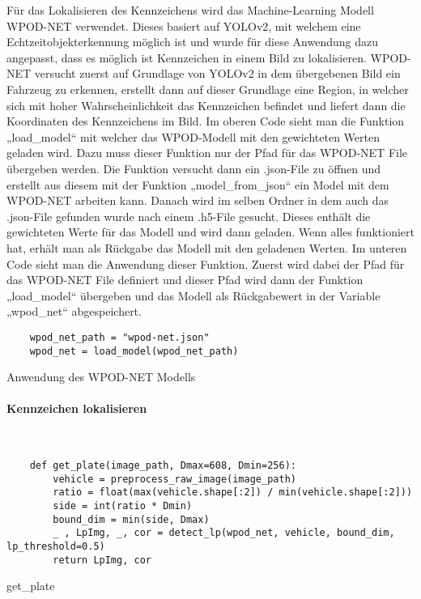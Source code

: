 Für das Lokalisieren des Kennzeichens wird das Machine-Learning Modell WPOD-NET verwendet. Dieses basiert auf YOLOv2, 
mit welchem eine Echtzeitobjekterkennung möglich ist und wurde für diese Anwendung dazu angepasst, dass es möglich ist 
Kennzeichen in einem Bild zu lokalisieren. WPOD-NET versucht zuerst auf Grundlage von YOLOv2 in dem übergebenen Bild 
ein Fahrzeug zu erkennen, erstellt dann auf dieser Grundlage eine Region, in welcher sich mit hoher Wahrscheinlichkeit 
das Kennzeichen befindet und liefert dann die Koordinaten des Kennzeichens im Bild. Im oberen Code sieht man die Funktion 
„load{\_}model“ mit welcher das WPOD-Modell mit den gewichteten Werten geladen wird. Dazu muss dieser Funktion nur der 
Pfad für das WPOD-NET File übergeben werden. Die Funktion versucht dann ein .json-File zu öffnen und erstellt aus 
diesem mit der Funktion „model{\_}from{\_}json“ ein Model mit dem WPOD-NET arbeiten kann. Danach wird im selben Ordner 
in dem auch das .json-File gefunden wurde nach einem .h5-File gesucht. Dieses enthält die gewichteten Werte für das 
Modell und wird dann geladen. Wenn alles funktioniert hat, erhält man als Rückgabe das Modell mit den geladenen Werten. 
Im unteren Code sieht man die Anwendung dieser Funktion. Zuerst wird dabei der Pfad für das WPOD-NET File definiert und 
dieser Pfad wird dann der Funktion „load{\_}model“ übergeben und das Modell als Rückgabewert in der Variable „wpod{\_}net“ abgespeichert.

\begin{listing}[H]
    \begin{verbatim}
    wpod_net_path = "wpod-net.json"
    wpod_net = load_model(wpod_net_path)
    \end{verbatim}
    \caption{Anwendung des WPOD-NET Modells}
\end{listing}

\paragraph{Kennzeichen lokalisieren}\mbox{}\\

\begin{listing}[H]
    \begin{verbatim}
    def get_plate(image_path, Dmax=608, Dmin=256):
        vehicle = preprocess_raw_image(image_path)
        ratio = float(max(vehicle.shape[:2]) / min(vehicle.shape[:2]))
        side = int(ratio * Dmin)
        bound_dim = min(side, Dmax)
        _ , LpImg, _, cor = detect_lp(wpod_net, vehicle, bound_dim, lp_threshold=0.5)
        return LpImg, cor
    \end{verbatim}
    \caption{get{\_}plate}
\end{listing}

